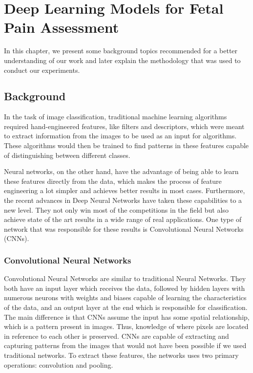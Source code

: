 \chapter{Deep Learning Models for Fetal Pain Assessment}

In this chapter, we present some background topics recommended for a better understanding of our work and later explain the methodology that was used to conduct our experiments.

\section{Background}

In the task of image classification, traditional machine learning algorithms required hand-engineered features, like filters and descriptors, which were meant to extract information from the images to be used as an input for algorithms. These algorithms would then be trained to find patterns in these features capable of distinguishing between different classes.

Neural networks, on the other hand, have the advantage of being able to learn these features directly from the data, which makes the process of feature engineering a lot simpler and achieves better results in most cases. Furthermore, the recent advances in Deep Neural Networks have taken these capabilities to a new level. They not only win most of the competitions in the field but also achieve state of the art results in a wide range of real applications. One type of network that was responsible for these results is Convolutional Neural Networks (CNNs).

\subsection{Convolutional Neural Networks}

Convolutional Neural Networks are similar to traditional Neural Networks. They both have an input layer which receives the data, followed by hidden layers with numerous neurons with weights and biases capable of learning the characteristics of the data, and an output layer at the end which is responsible for classification. The main difference is that CNNs assume the input has some spatial relationship, which is a pattern present in images. Thus, knowledge of where pixels are located in reference to each other is preserved. CNNs are capable of extracting and capturing patterns from the images that would not have been possible if we used traditional networks. To extract these features, the networks uses two primary operations: convolution and pooling.

